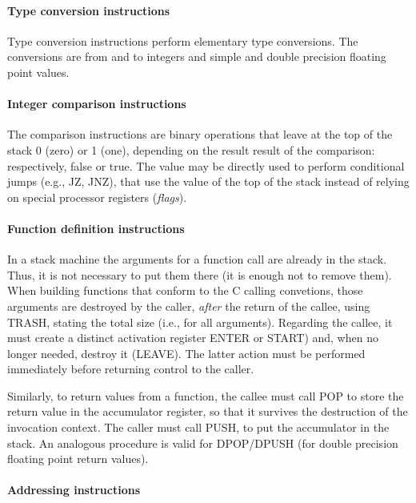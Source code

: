 \paragraph*{Type conversion instructions}

Type conversion instructions perform elementary type conversions. The conversions are from and to integers and simple and double precision floating point values.

\paragraph*{Integer comparison instructions}

The comparison instructions are binary operations that leave at the top of the stack 0 (zero) or 1 (one), depending on the result result of the comparison\+: respectively, {\ttfamily false} or {\ttfamily true}. The value may be directly used to perform conditional jumps (e.\+g., J\+Z, J\+N\+Z), that use the value of the top of the stack instead of relying on special processor registers ({\itshape flags}).

\paragraph*{Function definition instructions}

In a stack machine the arguments for a function call are already in the stack. Thus, it is not necessary to put them there (it is enough not to remove them). When building functions that conform to the C calling convetions, those arguments are destroyed by the caller, {\itshape after} the return of the callee, using {\ttfamily T\+R\+A\+S\+H}, stating the total size (i.\+e., for all arguments). Regarding the callee, it must create a distinct activation register {\ttfamily E\+N\+T\+E\+R} or {\ttfamily S\+T\+A\+R\+T}) and, when no longer needed, destroy it ({\ttfamily L\+E\+A\+V\+E}). The latter action must be performed immediately before returning control to the caller.

Similarly, to return values from a function, the callee must call {\ttfamily P\+O\+P} to store the return value in the accumulator register, so that it survives the destruction of the invocation context. The caller must call {\ttfamily P\+U\+S\+H}, to put the accumulator in the stack. An analogous procedure is valid for {\ttfamily D\+P\+O\+P/\+D\+P\+U\+S\+H} (for double precision floating point return values).

\paragraph*{Addressing instructions}

